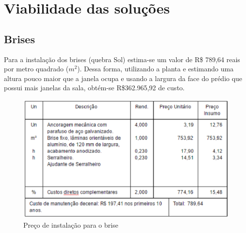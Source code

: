 \section{Viabilidade das soluções}
\subsection{Brises}
Para a instalação dos brises (quebra Sol) estima-se um valor de R\$ 789,64 reais por metro quadrado ($m^2$). Dessa forma, utilizando a planta e estimando uma altura pouco maior que a janela ocupa e usando a largura da face do prédio que possui mais janelas da sala, obtém-se R\$362.965,92 de custo.

\begin{figure}[!ht]
  \centering
  \includegraphics[keepaspectratio=true,scale=1]{figuras/tabelapreco.eps}
  \caption{Preço de instalação para o brise}
  \label{fig:preco_brise}
\end{figure}

